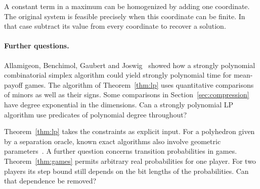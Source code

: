 A constant term in a maximum can be homogenized by adding one coordinate.
The original system is feasible precisely when this coordinate can be finite.
In that case subtract its value from every coordinate to recover a solution.

\paragraph{Further questions.}
Allamigeon, Benchimol, Gaubert and Joswig~\cite{ABGJgame} showed how a
strongly polynomial combinatorial simplex algorithm could yield strongly
polynomial time for mean-payoff games. The algorithm of Theorem~\ref{thm:lp}
uses quantitative comparisons of minors as well as their signs. Some
comparisons in Section~\ref{sec:compression} have degree exponential in
the dimensions. Can a strongly polynomial LP algorithm use predicates of
polynomial degree throughout?

Theorem~\ref{thm:lp} takes the constraints as explicit input. For a
polyhedron given by a separation oracle, known exact algorithms also
involve geometric parameters~\cite{DVZ26}. A further question concerns
transition probabilities in games. Theorem~\ref{thm:games} permits
arbitrary real probabilities for one player. For two players its step
bound still depends on the bit lengths of the probabilities.
Can that dependence be removed?

